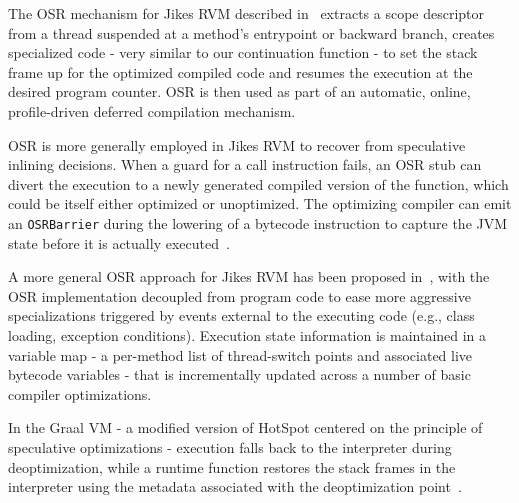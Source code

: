

The OSR mechanism for Jikes RVM described in~\cite{Fink03} extracts a scope descriptor from a thread suspended at a method's entrypoint or backward branch, creates specialized code - very similar to our continuation function - to set the stack frame up for the optimized compiled code and resumes the execution at the desired program counter. OSR is then used as part of an automatic, online, profile-driven deferred compilation mechanism.

OSR is more generally employed in Jikes RVM to recover from speculative inlining decisions. When a guard for a call instruction fails, an OSR stub can divert the execution to a newly generated compiled version of the function, which could be itself either optimized or unoptimized. The optimizing compiler can emit an {\tt OSRBarrier} during the lowering of a bytecode instruction to capture the JVM state before it is actually executed~\cite{grove16}.

A more general OSR approach for Jikes RVM has been proposed in~\cite{Soman06}, with the OSR implementation decoupled from program code to ease more aggressive specializations triggered by events external to the executing code (e.g., class loading, exception conditions). Execution state information is maintained in a variable map - a per-method list of thread-switch points and associated live bytecode variables - that is incrementally updated across a number of basic compiler optimizations. %

In the Graal VM - a modified version of HotSpot centered on the principle of speculative optimizations - execution falls back to the interpreter during deoptimization, while a runtime function restores the stack frames in the interpreter using the metadata associated with the deoptimization point~\cite{Duboscq13,Wurthinger13,Duboscq14}.

